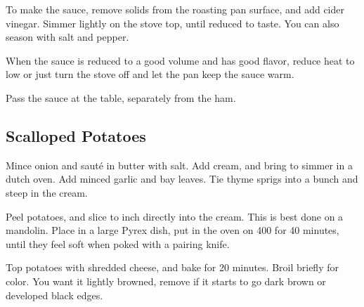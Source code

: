 \begin{recipe}
To make the sauce, remove solids from the roasting pan surface, and add cider vinegar. Simmer lightly on the stove top, until reduced to taste. You can also season with salt and pepper.

When the sauce is reduced to a good volume and has good flavor, reduce heat to low or just turn the stove off and let the pan keep the sauce warm.

Pass the sauce at the table, separately from the ham.

\subsection{Scalloped Potatoes}



Mince onion and sauté in butter with salt. Add cream, and bring to simmer in a dutch oven. Add minced garlic and bay leaves. Tie thyme sprigs into a bunch and steep in the cream.


Peel potatoes, and slice to  inch directly into the cream. This is best done on a mandolin. Place in a large Pyrex dish, put in the oven on 400 for 40 minutes, until they feel soft when poked with a pairing knife.


Top potatoes with shredded cheese, and bake for 20 minutes. Broil briefly for color. You want it lightly browned, remove if it starts to go dark brown or developed black edges. 

\end{recipe}

